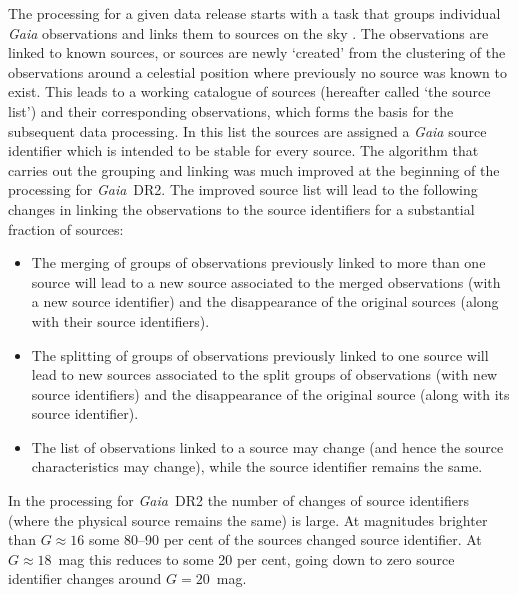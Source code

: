 \documentclass[longauth]{aa_gaia} %
\newcommand\gaia{\textit{Gaia}}
\newcommand\gdr[1]{\gaia~DR#1}
\begin{document}
The processing for a given data release starts with a task that groups individual {\gaia}
observations and links them to sources on the sky \citep[see][for a description of this
process]{DR2-DPACP-51,2016A&A...595A...3F}. The observations are linked to known sources, or sources are
newly `created' from the clustering of the observations around a celestial position where previously
no source was known to exist. This leads to a working catalogue of sources (hereafter called `the
source list') and their corresponding observations, which forms the basis for the subsequent data
processing. In this list the sources are assigned a {\gaia} source identifier which is intended to
be stable for every source. The algorithm that carries out the grouping and linking was much
improved at the beginning of the processing for \gdr{2}. The improved source list will lead to the
following changes in linking the observations to the source identifiers for a substantial fraction
of sources:
\begin{itemize}
  \item The merging of groups of observations previously linked to more than one source will lead to
    a new source associated to the merged observations (with a new source identifier) and the
    disappearance of the original sources (along with their source identifiers).
  \item The splitting of groups of observations previously linked to one source will lead to new
    sources associated to the split groups of observations (with new source identifiers) and the
    disappearance of the original source (along with its source identifier).
  \item The list of observations linked to a source may change (and hence the source characteristics
    may change), while the source identifier remains the same.
\end{itemize}
In the processing for \gdr{2} the number of changes of source identifiers (where the physical
source remains the same) is large. At magnitudes brighter than $G\approx16$ some 80--90 per cent of
the sources changed source identifier. At $G\approx18$~mag this reduces to some 20 per cent, going
down to zero source identifier changes around $G=20$~mag.
\end{document}
